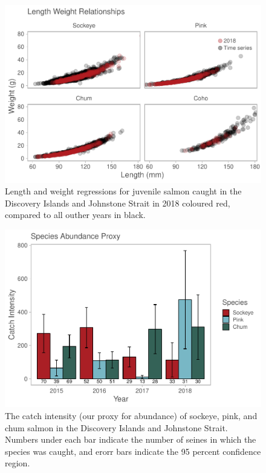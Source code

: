 \documentclass[fleqn,10pt]{wlpeerj} %
\begin{document}
\begin{figure}
\centering
\includegraphics{Migration_Observations_Report_files/figure-latex/condition-plot-1.pdf}
\caption{\label{fig:condition-plot}Length and weight regressions for juvenile salmon caught in the Discovery Islands and Johnstone Strait in 2018 coloured red, compared to all outher years in black.}
\end{figure}

\begin{figure}[H]
\includegraphics[width=0.9\linewidth]{Migration_Observations_Report_files/figure-latex/catch-intensity-plot-1} \caption{The catch intensity (our proxy for abundance) of sockeye, pink, and chum salmon in the Discovery Islands and Johnstone Strait. Numbers under each bar indicate the number of seines in which the species was caught, and erorr bars indicate the 95 percent confidence region.}\label{fig:catch-intensity-plot}
\end{figure}
\end{document}
